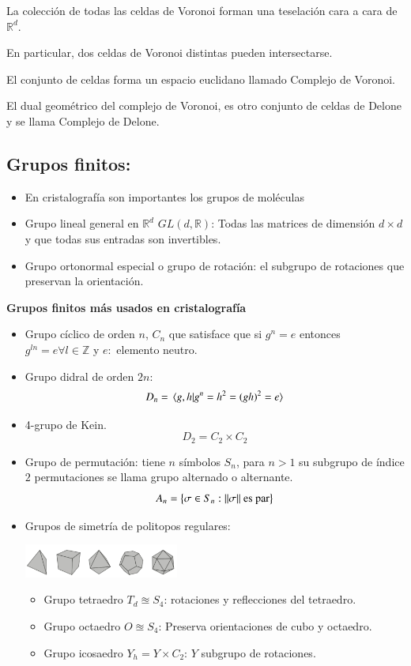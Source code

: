 La colección de todas las celdas de Voronoi forman una teselación cara a cara de $\mathbb{R}^d$.

En particular, dos celdas de Voronoi distintas pueden intersectarse.

El conjunto de celdas forma un espacio euclidano llamado Complejo de Voronoi.

El dual geométrico del complejo de Voronoi, es otro conjunto de celdas de Delone y se llama Complejo de Delone.


\subsection{Grupos finitos:}

\begin{itemize}
    \item En cristalografía son importantes los grupos de moléculas
    \item Grupo lineal general en $\mathbb{R}^d$ $GL(d,\mathbb{R})$:
    Todas las matrices de dimensión $d\times d$ y que todas sus entradas son invertibles.
    \item Grupo ortonormal especial o grupo de rotación: el subgrupo de rotaciones que preservan la orientación.
\end{itemize}

\textbf{Grupos finitos más usados en cristalografía}
\begin{itemize}
    \item Grupo cíclico de orden $n$, $C_n$ que satisface que si $g^n=e$ entonces $g^{ln}=e\forall l \in \mathbb{Z}$ y $e:$ elemento neutro.
    \item Grupo didral de orden $2n$:
    $$D_n=\bra*{g,h}\ket*{g^n=h^2=(gh)^2=e}$$
    \item 4-grupo de Kein.
    $$D_2=C_2\times C_2$$
    \item Grupo de permutación: tiene $n$ símbolos $S_n$, para $n>1$ su subgrupo de índice $2$ permutaciones se llama grupo alternado o alternante.
    $$A_n=\left\{\sigma\in S_n:\norm{\sigma}\text{ es par}\right\}$$
    \item Grupos de simetría de politopos regulares:
    
    \includegraphics[width=0.4\textwidth]{Graficas/Aug6-1.png}
    \begin{itemize}
        \item Grupo tetraedro $T_d\approxeq S_4$: rotaciones y reflecciones del tetraedro.
        \item Grupo octaedro $O\approxeq S_4$: Preserva orientaciones de cubo y octaedro.
        \item Grupo icosaedro $Y_h=Y\times C_2$: $Y$ subgrupo de rotaciones.
    \end{itemize}
\end{itemize}


